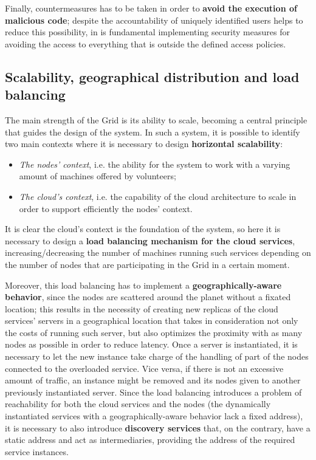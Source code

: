 Finally, countermeasures has to be taken in order to \textbf{avoid the execution of malicious code}; despite the accountability of uniquely identified users helps to reduce this possibility, in is fundamental implementing security measures for avoiding the access to everything that is outside the defined access policies.

\subsection{Scalability, geographical distribution and load balancing}\label{scalabilitu_geographical_distribution_and_load_balancing}
The main strength of the Grid is its ability to scale, becoming a central principle that guides the design of the system. In such a system, it is possible to identify two main contexts where it is necessary to design \textbf{horizontal scalability}:
\vspace{5mm}
\begin{itemize}
    \item \textit{The nodes' context}, i.e. the ability for the system to work with a varying amount of machines offered by volunteers;
    \item \textit{The cloud's context}, i.e. the capability of the cloud architecture to scale in order to support efficiently the nodes' context.
\end{itemize}

It is clear the cloud's context is the foundation of the system, so here it is necessary to design a \textbf{load balancing mechanism for the cloud services}, increasing/decreasing the number of machines running such services depending on the number of nodes that are participating in the Grid in a certain moment.

Moreover, this load balancing has to implement a \textbf{geographically-aware behavior}, since the nodes are scattered around the planet without a fixated location; this results in the necessity of creating new replicas of the cloud services' servers in a geographical location that takes in consideration not only the costs of running such server, but also optimizes the proximity with as many nodes as possible in order to reduce latency. Once a server is instantiated, it is necessary to let the new instance take charge of the handling of part of the nodes connected to the overloaded service. Vice versa, if there is not an excessive amount of traffic, an instance might be removed and its nodes given to another previously instantiated server.
Since the load balancing introduces a problem of reachability for both the cloud services and the nodes (the dynamically instantiated services with a geographically-aware behavior lack a fixed address), it is necessary to also introduce \textbf{discovery services} that, on the contrary, have a static address and act as intermediaries, providing the address of the required service instances.

